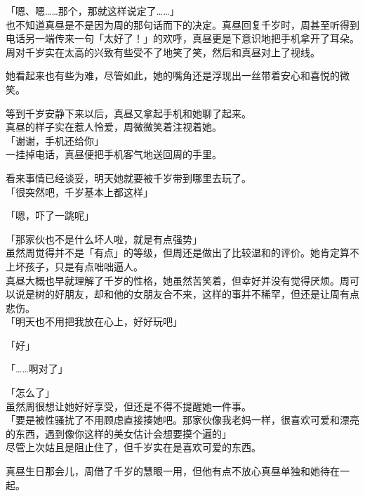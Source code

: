 「嗯、嗯……那个，那就这样说定了……」\\

也不知道真昼是不是因为周的那句话而下的决定。真昼回复千岁时，周甚至听得到电话另一端传来一句「太好了！」的欢呼，真昼更是下意识地把手机拿开了耳朵。\\

周对千岁实在太高的兴致有些受不了地笑了笑，然后和真昼对上了视线。

她看起来也有些为难，尽管如此，她的嘴角还是浮现出一丝带着安心和喜悦的微笑。

等到千岁安静下来以后，真昼又拿起手机和她聊了起来。\\

真昼的样子实在惹人怜爱，周微微笑着注视着她。\\

「谢谢，手机还给你」\\

一挂掉电话，真昼便把手机客气地送回周的手里。

看来事情已经谈妥，明天她就要被千岁带到哪里去玩了。\\

「很突然吧，千岁基本上都这样」

「嗯，吓了一跳呢」

「那家伙也不是什么坏人啦，就是有点强势」\\

虽然周觉得并不是「有点」的等级，但周还是做出了比较温和的评价。她肯定算不上坏孩子，只是有点咄咄逼人。\\

真昼大概也早就理解了千岁的性格，她虽然苦笑着，但幸好并没有觉得厌烦。周可以说是树的好朋友，却和他的女朋友合不来，这样的事并不稀罕，但还是让周有点悲伤。\\

「明天也不用把我放在心上，好好玩吧」

「好」

「……啊对了」

「怎么了」\\

虽然周很想让她好好享受，但还是不得不提醒她一件事。\\

「要是被性骚扰了不用顾虑直接揍她吧。那家伙像我老妈一样，很喜欢可爱和漂亮的东西，遇到像你这样的美女估计会想要摸个遍的」\\

尽管上次姑且是阻止住了，但千岁实在是喜欢可爱的东西。

真昼生日那会儿，周借了千岁的慧眼一用，但他有点不放心真昼单独和她待在一起。\\

